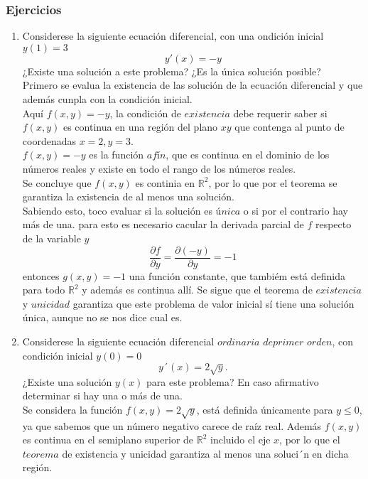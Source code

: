 \documentclass[10pt,a4paper,notitlepage]{report}
\begin{document}
\begin{itemize}
\subsubsection{Ejercicios}
\begin{enumerate}
\Large
\item Considerese la siguiente ecuación diferencial, con una ondición inicial $y(1) = 3$
\begin{equation}
y' (x) = -y
\end{equation}
¿Existe una solución a este problema? ¿Es la única solución posible? \\
\large 
Primero se evalua la existencia de las solución de la ecuación diferencial y que además cunpla con la condición inicial. \\
Aquí $f(x, y) = -y$, la condición de $existencia$ debe requerir saber si $f (x, y)$ es continua en una región del plano $xy$ que contenga al punto de coordenadas $x = 2, y = 3$. \\
$f(x, y) = -y$ es la función $afín$, que es continua en el dominio de los números reales y existe en todo el rango de los números reales. \\
Se concluye que $f(x, y)$ es continia en $\mathbb{R}^{2}$, por lo que por el teorema se garantiza la existencia de al menos una solución. \\
Sabiendo esto, toco evaluar si la solución es $única$ o si por el contrario hay más de una. para esto es necesario cacular la derivada parcial de $f$ respecto de la variable $y$
\begin{equation}
\frac{\partial f}{\partial y} = \frac{\partial (-y)}{\partial y} = -1
\end{equation}
entonces $g(x, y) = -1$ una función constante, que tambiém está definida para todo $\mathbb{R}^{2}$ y además es continua allí. Se sigue que el teorema de $existencia$ y $unicidad$ garantiza que este problema de valor inicial sí tiene una solución única, aunque no se nos dice cual es. \\
\Large
\item Considerese la siguiente ecuación diferencial $ordinaria$ $de primer$ $orden$, con condición inicial $y(0) = 0$
\begin{equation}
y´(x) = 2 \sqrt{y}.
\end{equation}
¿Existe una solución $y (x)$ para este problema?  En caso afirmativo determinar si hay una o más de una. \\
\large
Se considera la función $f(x, y) = 2\sqrt{y}$, está definida únicamente para $y \leq 0$, ya que sabemos que un número negativo carece de raíz real. Además $f(x, y)$ es continua en el semiplano superior de $\mathbb{R}^{2}$ incluido el eje $x$, por lo que el $teorema$ de existencia y unicidad garantiza al menos una soluci´n en dicha región. \\

\end{enumerate}
\end{itemize}
\end{document}
